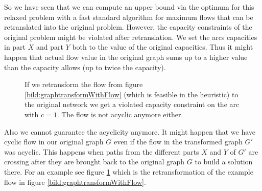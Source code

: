 So we have seen that we can compute an upper bound via the optimum for this relaxed problem with a fast standard 
algorithm for maximum flows that can be retranslated into the original problem. 
However, the capacity constraints of the original problem might be violated after retranslation. We set the arcs 
capacities in part $X$ and part $Y$ both to the value of the original capacities. Thus it might happen that actual flow 
value in the original graph sums up to a higher value than the capacity allows (up to twice the capacity). 


\begin{figure}[h!]
\centering
{}
\caption{If we retransform the flow from figure \ref{bild:graphtransformWithFlow} (which is feasible in the heuristic) 
to the original network we get a violated capacity constraint on the arc with $c=1$. The flow is not acyclic anymore 
either.}
 \label{bild:graphretransformWithFlow}
\end{figure}
Also we cannot guarantee the acyclicity anymore. It might happen that we have cyclic flow in our 
original graph $G$ even if the flow in the transformed graph $G'$ was acyclic. This happens when paths from 
the different parts $X$ and $Y$ of $G'$ are crossing after they are brought back to the original graph $G$ to 
build a solution there. For an example see figure \ref{bild:graphretransformWithFlow} which is the retransformation of 
the example flow in figure \ref{bild:graphtransformWithFlow}.